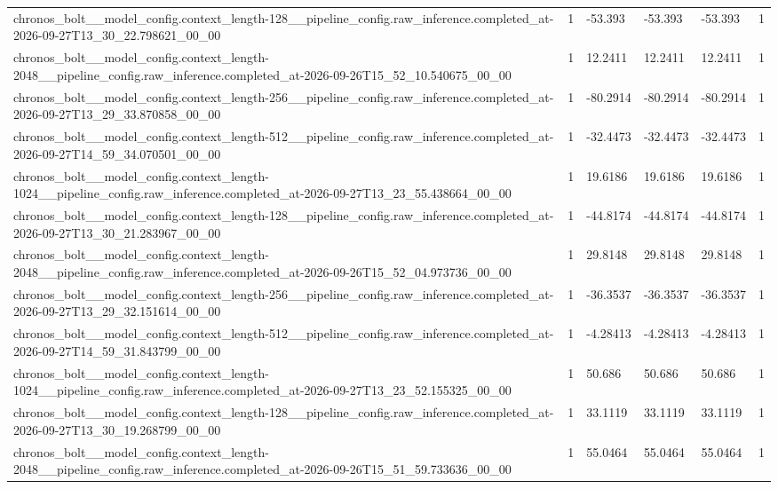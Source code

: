 \begin{tabular}{llllll}
chronos\_bolt\_\_model\_config.context\_length-128\_\_pipeline\_config.raw\_inference.completed\_at-2026-09-27T13\_30\_22.798621\_00\_00 & 1 & -53.393 & -53.393 & -53.393 & 1 \\
chronos\_bolt\_\_model\_config.context\_length-2048\_\_pipeline\_config.raw\_inference.completed\_at-2026-09-26T15\_52\_10.540675\_00\_00 & 1 & 12.2411 & 12.2411 & 12.2411 & 1 \\
chronos\_bolt\_\_model\_config.context\_length-256\_\_pipeline\_config.raw\_inference.completed\_at-2026-09-27T13\_29\_33.870858\_00\_00 & 1 & -80.2914 & -80.2914 & -80.2914 & 1 \\
chronos\_bolt\_\_model\_config.context\_length-512\_\_pipeline\_config.raw\_inference.completed\_at-2026-09-27T14\_59\_34.070501\_00\_00 & 1 & -32.4473 & -32.4473 & -32.4473 & 1 \\
chronos\_bolt\_\_model\_config.context\_length-1024\_\_pipeline\_config.raw\_inference.completed\_at-2026-09-27T13\_23\_55.438664\_00\_00 & 1 & 19.6186 & 19.6186 & 19.6186 & 1 \\
chronos\_bolt\_\_model\_config.context\_length-128\_\_pipeline\_config.raw\_inference.completed\_at-2026-09-27T13\_30\_21.283967\_00\_00 & 1 & -44.8174 & -44.8174 & -44.8174 & 1 \\
chronos\_bolt\_\_model\_config.context\_length-2048\_\_pipeline\_config.raw\_inference.completed\_at-2026-09-26T15\_52\_04.973736\_00\_00 & 1 & 29.8148 & 29.8148 & 29.8148 & 1 \\
chronos\_bolt\_\_model\_config.context\_length-256\_\_pipeline\_config.raw\_inference.completed\_at-2026-09-27T13\_29\_32.151614\_00\_00 & 1 & -36.3537 & -36.3537 & -36.3537 & 1 \\
chronos\_bolt\_\_model\_config.context\_length-512\_\_pipeline\_config.raw\_inference.completed\_at-2026-09-27T14\_59\_31.843799\_00\_00 & 1 & -4.28413 & -4.28413 & -4.28413 & 1 \\
chronos\_bolt\_\_model\_config.context\_length-1024\_\_pipeline\_config.raw\_inference.completed\_at-2026-09-27T13\_23\_52.155325\_00\_00 & 1 & 50.686 & 50.686 & 50.686 & 1 \\
chronos\_bolt\_\_model\_config.context\_length-128\_\_pipeline\_config.raw\_inference.completed\_at-2026-09-27T13\_30\_19.268799\_00\_00 & 1 & 33.1119 & 33.1119 & 33.1119 & 1 \\
chronos\_bolt\_\_model\_config.context\_length-2048\_\_pipeline\_config.raw\_inference.completed\_at-2026-09-26T15\_51\_59.733636\_00\_00 & 1 & 55.0464 & 55.0464 & 55.0464 & 1 \\

\end{tabular}
